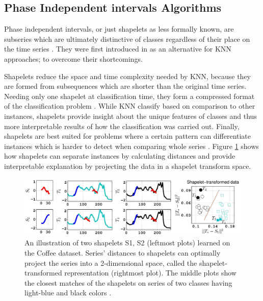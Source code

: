 \subsection{Phase Independent intervals Algorithms}
\label{SubsectionShapelet}
Phase independent intervals, or just shapelets as less formally known,
are subseries which are ultimately distinctive of classes regardless of their place on the time series \cite{schafer2017fast,bagnall2017great}.
They were first introduced in \cite{ye2009time} as an alternative for KNN approaches; to overcome their shortcomings.

Shapelets reduce the space and time complexity needed by KNN, because they are formed from subsequences which are shorter than
the original time series. Needing only one shapelet at classification time, they form a compressed format of the classification problem \cite{bostrom2017shapelet,ye2009time,mueen2011logical}.
While KNN classify based on comparison to other instances, shapelets provide insight about the unique features of classes and thus more
interpretable results of how the classification was carried out.
Finally, shapelets are best suited for problems where a certain pattern can differentiate instances which is harder to detect when comparing whole series \cite{bagnall2017great,Bostrom2017}.
Figure \ref{Img:Shapelet} shows how shapelets can separate instances by calculating distances and provide interpretable explanation by projecting the data in a shapelet transform space.

\begin{figure}[!htbp]
    \captionsetup{justification=raggedright}
    \centering
    \includegraphics[scale = 0.45]{Shapelets.JPG}
    \centering
    \caption{An illustration of two shapelets S1, S2 (leftmost plots) learned on the Coffee dataset. Series’ distances to shapelets can optimally project the series into a 2-dimensional space, called the shapelet-transformed representation \cite{lines2012shapelet} (rightmost plot). The middle plots show the closest matches of the shapelets on series of two classes having light-blue and black colors \cite{grabocka2014learning}.}
    \label{Img:Shapelet}
\end{figure}

